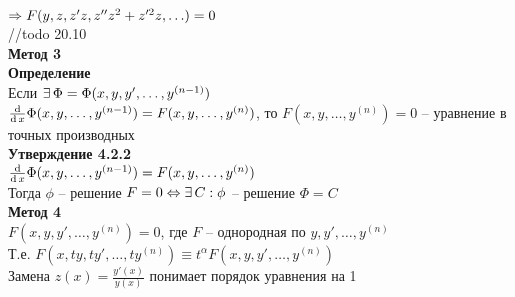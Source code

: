 \documentclass[12pt]{article}
\begin{document}
$\Rightarrow F(y, z, z'z, z''z^2 + z'^2z, \ldots) = 0$\\
//todo 20.10\\
\textbf{Метод 3}\\
\textbf{Определение}\\
Если $\exists\, \Phi = \Phi(x, y, y', \ldots, y^{(n-1)})$\\
$\frac{\operatorname{d}}{\operatorname{d} x}\Phi(x, y, \ldots, y^{(n-1)}) = F(x, y, \ldots, y^{(n)})$, то $F(x, y, \ldots, y^{(n)}) = 0$ -- уравнение в точных производных\\
\textbf{Утверждение 4.2.2}\\
$\frac{\operatorname{d}}{\operatorname{d} x}\Phi(x, y, \ldots, y^{(n-1)}) = F(x, y, \ldots, y^{(n)})$\\
Тогда $\phi$ -- решение $F = 0 \Leftrightarrow \exists\, C: \phi$ -- решение $\Phi = C$\\
\textbf{Метод 4}\\
$F(x, y, y', \ldots, y^{(n)}) = 0$, где $F$ -- однородная по $y, y', \ldots, y^{(n)}$\\
Т.е. $F(x, ty, ty', \ldots, ty^{(n)}) \equiv t^\alpha F(x, y, y', \ldots, y^{(n)})$\\
Замена $z(x) = \frac{y'(x)}{y(x)}$ понимает порядок уравнения на 1\\
\end{document}
